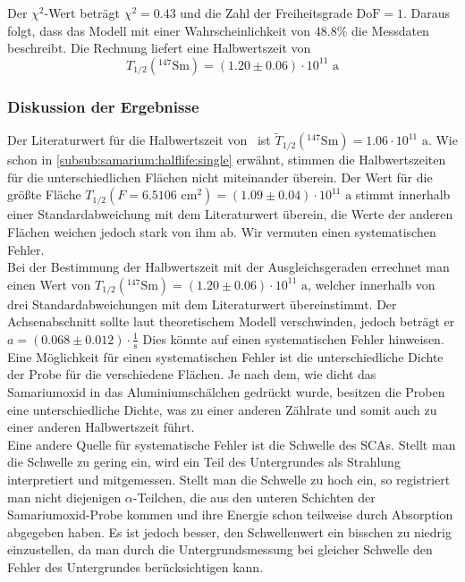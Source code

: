 Der $\chi^2$-Wert beträgt $\chi^2 =0.43$ und die Zahl der Freiheitsgrade $\text{DoF} = 1$. Daraus folgt, dass das Modell mit einer 
Wahrscheinlichkeit von $48.8\%$ die Messdaten beschreibt.
Die Rechnung liefert eine Halbwertszeit von
\begin{equation}
  T_{1/2}({}^{147}\text{Sm}) = (1.20 \pm 0.06) \cdot 10^{11} \text{ a}
\end{equation}

\subsubsection{Diskussion der Ergebnisse}
\label{subsub:samarium:discussion}
Der Literaturwert für die Halbwertszeit von \samarium\, ist $\tilde{T}_{1/2}({}^{147}\text{Sm}) = 1.06 \cdot 10^{11} \text{ a}$.
Wie schon in \ref{subsub:samarium:halflife:single} erwähnt, stimmen die Halbwertszeiten für die unterschiedlichen Flächen nicht miteinander 
überein. Der Wert für die größte Fläche $T_{1/2}(F=6.5106 \text{ cm}^2) = (1.09 \pm 0.04)\cdot 10^{11} \text{ a}$ stimmt innerhalb einer 
Standardabweichung mit dem Literaturwert überein, die Werte der anderen Flächen weichen jedoch stark von ihm ab. Wir vermuten einen systematischen 
Fehler.\\
Bei der Bestimmung der Halbwertszeit mit der Ausgleichsgeraden errechnet man einen Wert von 
$T_{1/2}({}^{147}\text{Sm}) = (1.20 \pm 0.06) \cdot 10^{11} \text{ a}$, welcher innerhalb von drei Standardabweichungen mit dem Literaturwert 
übereinstimmt. Der Achsenabschnitt sollte laut theoretischem Modell verschwinden, jedoch beträgt er $a = (0.068  \pm 0.012 ) \cdot \frac{1}{\text{s}}$
Dies könnte auf einen systematischen Fehler hinweisen. \\
Eine Möglichkeit für einen systematischen Fehler ist die unterschiedliche Dichte der Probe für die verschiedene Flächen. Je nach dem, wie dicht 
das Samariumoxid in das Aluminiumschälchen gedrückt wurde, besitzen die Proben eine unterschiedliche Dichte, was zu einer anderen Zählrate und 
somit auch zu einer anderen Halbwertszeit führt. \\
Eine andere Quelle für systematische Fehler ist die Schwelle des SCAs. Stellt man die Schwelle zu 
gering ein, wird ein Teil des Untergrundes als Strahlung interpretiert und mitgemessen. Stellt man die Schwelle zu hoch ein, so registriert man 
nicht diejenigen $\alpha$-Teilchen, die aus den unteren Schichten der Samariumoxid-Probe kommen und ihre Energie schon teilweise durch Absorption 
abgegeben haben. Es ist jedoch besser, den Schwellenwert ein bisschen zu niedrig einzustellen, da man durch die Untergrundsmessung bei gleicher 
Schwelle den Fehler des Untergrundes berücksichtigen kann.

